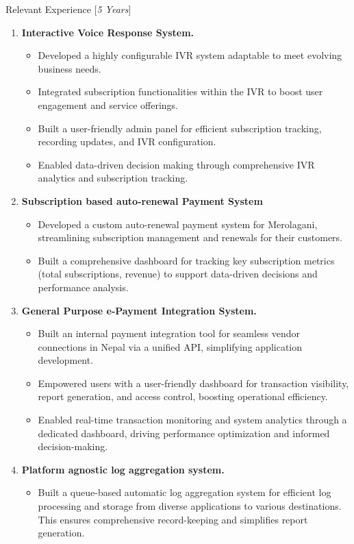 \documentclass{resume} %
\begin{document}
\begin{rSection}{Relevant Experience [\textit{5 Years}]}
    \begin{enumerate}
        \item \textbf{Interactive Voice Response System.}
              \begin{itemize}
                  \item Developed a highly configurable IVR system adaptable to meet evolving business needs.
                  \item Integrated subscription functionalities within the IVR to boost user engagement and service offerings.
                  \item Built a user-friendly admin panel for efficient subscription tracking, recording updates, and IVR configuration.
                  \item Enabled data-driven decision making through comprehensive IVR analytics and subscription tracking.
              \end{itemize}

        \item \textbf{Subscription based auto-renewal Payment System}
              \begin{itemize}
                  \item   Developed a custom auto-renewal payment system for Merolagani, streamlining subscription management and renewals for their customers.
                  \item  Built a comprehensive dashboard for tracking key subscription metrics (total subscriptions, revenue) to support data-driven decisions and performance analysis.
              \end{itemize}

        \item \textbf{General Purpose e-Payment Integration System.}
              \begin{itemize}
                  \item Built an internal payment integration tool for seamless vendor connections in Nepal via a unified API, simplifying application development.
                  \item Empowered users with a user-friendly dashboard for transaction visibility, report generation, and access control, boosting operational efficiency.
                  \item Enabled real-time transaction monitoring and system analytics through a dedicated dashboard, driving performance optimization and informed decision-making.
              \end{itemize}

        \item \textbf{Platform agnostic log aggregation system.}
              \begin{itemize}
                  \item Built a queue-based automatic log aggregation system for efficient log processing and storage from diverse applications to various destinations. This ensures comprehensive record-keeping and simplifies report generation.
              \end{itemize}
    \end{enumerate}
\end{rSection}
\end{document}
